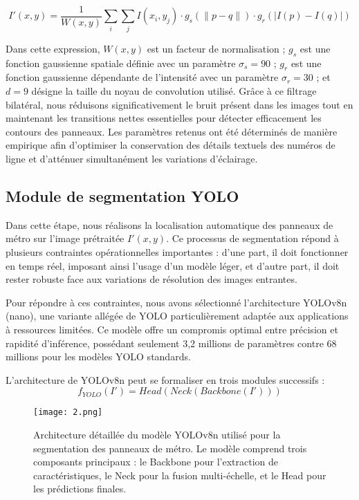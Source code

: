 \documentclass[journal]{IEEEtran}
\begin{document}
$$\scriptstyle I'(x,y) = \frac{1}{W(x,y)} \sum_{i}\sum_{j} I(x_i,y_j)\cdot g_s(\|p - q\|)\cdot g_r(|I(p) - I(q)|)$$

Dans cette expression, $W(x,y)$ est un facteur de normalisation ; $g_s$ est une fonction gaussienne spatiale définie avec un paramètre $\sigma_s = 90$ ; $g_r$ est une fonction gaussienne dépendante de l'intensité avec un paramètre $\sigma_r = 30$ ; et $d = 9$ désigne la taille du noyau de convolution utilisé. Grâce à ce filtrage bilatéral, nous réduisons significativement le bruit présent dans les images tout en maintenant les transitions nettes essentielles pour détecter efficacement les contours des panneaux. Les paramètres retenus ont été déterminés de manière empirique afin d'optimiser la conservation des détails textuels des numéros de ligne et d'atténuer simultanément les variations d'éclairage.

\subsection{Module de segmentation YOLO}

Dans cette étape, nous réalisons la localisation automatique des panneaux de métro sur l'image prétraitée $I'(x,y)$. Ce processus de segmentation répond à plusieurs contraintes opérationnelles importantes : d'une part, il doit fonctionner en temps réel, imposant ainsi l'usage d'un modèle léger, et d'autre part, il doit rester robuste face aux variations de résolution des images entrantes.

Pour répondre à ces contraintes, nous avons sélectionné l'architecture YOLOv8n (nano), une variante allégée de YOLO particulièrement adaptée aux applications à ressources limitées. Ce modèle offre un compromis optimal entre précision et rapidité d'inférence, possédant seulement 3,2 millions de paramètres contre 68 millions pour les modèles YOLO standards.

L'architecture de YOLOv8n peut se formaliser en trois modules successifs :
$$f_{YOLO}(I') = Head(Neck(Backbone(I')))$$

\begin{figure}[H]
\begin{center}
\texttt{[image: 2.png]}
\caption{Architecture détaillée du modèle YOLOv8n utilisé pour la segmentation des panneaux de métro. Le modèle comprend trois composants principaux : le Backbone pour l'extraction de caractéristiques, le Neck pour la fusion multi-échelle, et le Head pour les prédictions finales.}
\label{fig:yolo_architecture}
\end{center}
\end{figure}
\end{document}
